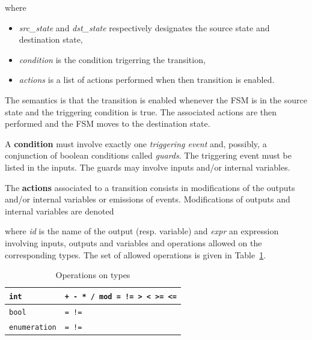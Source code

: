 where
\begin{itemize}
\item \emph{src\_state} and \emph{dst\_state} respectively designates the source state and destination state,
\item \emph{condition} is the condition trigerring the transition,
\item \emph{actions} is a list of actions performed when then transition is enabled.
\end{itemize}

\medskip The semantics is that the transition is enabled whenever the FSM is in the source state and
the triggering condition is true. The associated actions are then performed and the FSM moves to the
destination state.

\medskip
A \textbf{condition} must involve exactly one \emph{triggering event} and, possibly, a conjunction of boolean
conditions called \emph{guards}. The triggering event must be listed in the inputs. The guards may
involve inputs and/or internal variables.

\medskip The \textbf{actions} associated to a transition consists in modifications of the outputs
and/or internal variables or emissions of events. Modifications of outputs and internal variables
are denoted

\begin{center}
\end{center}

where \emph{id} is the name of the output (resp. variable) and \emph{expr} an expression involving
inputs, outputs and variables and operations allowed on the corresponding types. The set of allowed
operations is given in Table~\ref{tab:type-ops}.

\begin{table}
\begin{minipage}[c]{1.0\linewidth}
\small
\begin{center}
\begin{tabular}{|l|l|} \hline
{\tt int}       & {\tt + - * / mod = != > < >= <=} \\  \hline
{\tt bool}      & {\tt = !=} \\ \hline 
{\tt enumeration}     & {\tt = !=} \\  \hline
\end{tabular}
\caption{Operations on types}
\label{tab:type-ops}
\end{center}
\end{minipage}
\end{table}

